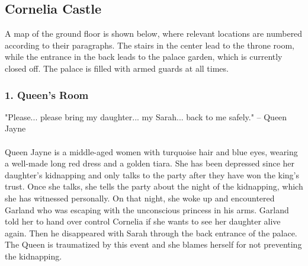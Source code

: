 \subsection*{Cornelia Castle}
A map of the ground floor is shown below, where relevant locations are numbered according to their paragraphs.
The stairs in the center lead to the throne room, while the entrance in the back leads to the palace garden, which is currently closed off.
The palace is filled with armed guards at all times.
\begin{center} 
\end{center}
\subsubsection*{1. Queen's Room}
"Please... please bring my daughter... my Sarah... back to me safely."
\indent -- Queen Jayne \\\\
Queen Jayne is a middle-aged women with turquoise hair and blue eyes, wearing a well-made long red dress and a golden tiara.
She has been depressed since her daughter's kidnapping and only talks to the party after they have won the king's trust.
Once she talks, she tells the party about the night of the kidnapping, which she has witnessed personally.
On that night, she woke up and encountered Garland who was escaping with the unconscious princess in his arms.
Garland told her to hand over control Cornelia if she wants to see her daughter alive again.
Then he disappeared with Sarah through the back entrance of the palace.
The Queen is traumatized by this event and she blames herself for not preventing the kidnapping.

